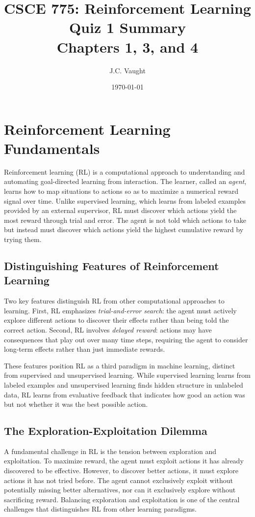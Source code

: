 \documentclass[12pt]{article}
\title{CSCE 775: Reinforcement Learning\\Quiz 1 Summary\\Chapters 1, 3, and 4}
\author{J.C. Vaught}
\date{\today}
\begin{document}
\maketitle

\tableofcontents
\newpage

\section{Reinforcement Learning Fundamentals}

Reinforcement learning (RL) is a computational approach to understanding and automating goal-directed learning from interaction. The learner, called an \textit{agent}, learns how to map situations to actions so as to maximize a numerical reward signal over time. Unlike supervised learning, which learns from labeled examples provided by an external supervisor, RL must discover which actions yield the most reward through trial and error. The agent is not told which actions to take but instead must discover which actions yield the highest cumulative reward by trying them.

\subsection{Distinguishing Features of Reinforcement Learning}

Two key features distinguish RL from other computational approaches to learning. First, RL emphasizes \textit{trial-and-error search}: the agent must actively explore different actions to discover their effects rather than being told the correct action. Second, RL involves \textit{delayed reward}: actions may have consequences that play out over many time steps, requiring the agent to consider long-term effects rather than just immediate rewards.

These features position RL as a third paradigm in machine learning, distinct from supervised and unsupervised learning. While supervised learning learns from labeled examples and unsupervised learning finds hidden structure in unlabeled data, RL learns from evaluative feedback that indicates how good an action was but not whether it was the best possible action.

\subsection{The Exploration-Exploitation Dilemma}

A fundamental challenge in RL is the tension between exploration and exploitation. To maximize reward, the agent must exploit actions it has already discovered to be effective. However, to discover better actions, it must explore actions it has not tried before. The agent cannot exclusively exploit without potentially missing better alternatives, nor can it exclusively explore without sacrificing reward. Balancing exploration and exploitation is one of the central challenges that distinguishes RL from other learning paradigms.
\end{document}
